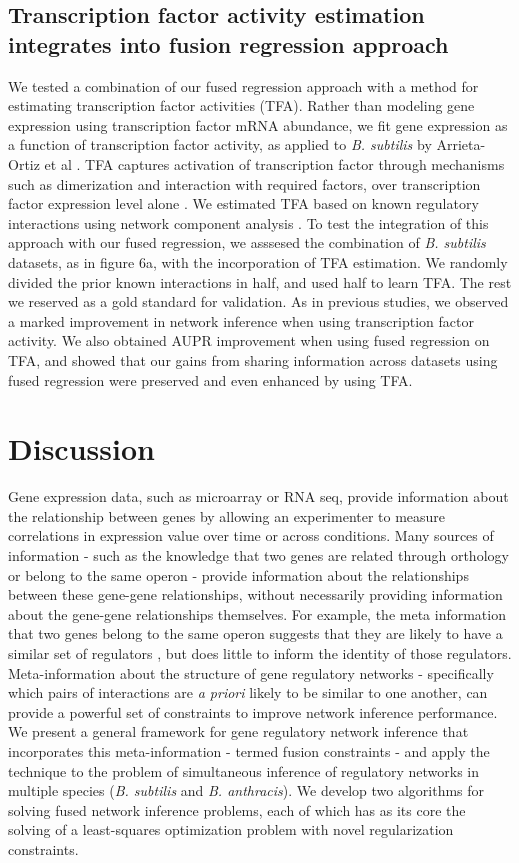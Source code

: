 \documentclass[11pt]{article}
\begin{document}
\subsection{Transcription factor activity estimation integrates into fusion regression approach}
We tested a combination of our fused regression approach with a method for estimating transcription factor activities (TFA). Rather than modeling gene expression using transcription factor mRNA abundance, we fit gene expression as a function of transcription factor activity, as applied to \textit{B. subtilis} by Arrieta-Ortiz et al \cite{arrieta-ortiz_experimentally_2015}. TFA captures activation of transcription factor through mechanisms such as dimerization and interaction with required factors, over transcription factor expression level alone \cite{fu_reconstructing_2011}. We estimated TFA based on known regulatory interactions using network component analysis \cite{liao2003network}. To test the integration of this approach with our fused regression, we asssesed the combination of \textit{B. subtilis} datasets, as in figure 6a, with the incorporation of TFA estimation. We randomly divided the prior known interactions in half, and used half to learn TFA. The rest we reserved as a gold standard for validation. As in previous studies, we observed a marked improvement in network inference when using transcription factor activity. We also obtained AUPR improvement when using fused regression on TFA, and showed that our gains from sharing information across datasets using fused regression were preserved and even enhanced by using TFA. 

\section{Discussion}
Gene expression data, such as microarray or RNA seq, provide information about the relationship between genes by allowing an experimenter to measure correlations in expression value over time or across conditions. Many sources of information - such as the knowledge that two genes are related through orthology or belong to the same operon - provide information about the relationships between these gene-gene relationships, without necessarily providing information about the gene-gene relationships themselves. For example, the meta information that two genes belong to the same operon suggests that they are likely to have a similar set of regulators \cite{lawrence_shared_2002}, but does little to inform the identity of those regulators. Meta-information about the structure of gene regulatory networks - specifically which pairs of interactions are \textit{a priori} likely to be similar to one another, can provide a powerful set of constraints to improve network inference performance. We present a general framework for gene regulatory network inference that incorporates this meta-information - termed fusion constraints - and apply the technique to the problem of simultaneous inference of regulatory networks in multiple species (\textit{B. subtilis} and \textit{B. anthracis}). We develop two algorithms for solving fused network inference problems, each of which has as its core the solving of a least-squares optimization problem with novel regularization constraints.
\end{document}
